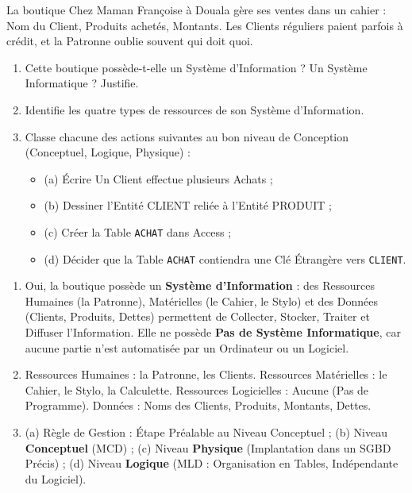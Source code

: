 \documentclass[11pt]{article}
\begin{document}
\begin{exercice}
La boutique \og Chez Maman Françoise \fg{} à Douala gère ses ventes dans un cahier : Nom du Client, Produits achetés, Montants. Les Clients réguliers paient parfois à crédit, et la Patronne oublie souvent qui doit quoi.
\begin{enumerate}
\item Cette boutique possède-t-elle un Système d'Information ? Un Système Informatique ? Justifie.
\item Identifie les quatre types de ressources de son Système d'Information.
\item Classe chacune des actions suivantes au bon niveau de Conception (Conceptuel, Logique, Physique) :
      \begin{itemize}
      \item (a) Écrire \og Un Client effectue plusieurs Achats \fg{} ;
      \item (b) Dessiner l'Entité CLIENT reliée à l'Entité PRODUIT ;
      \item (c) Créer la Table \texttt{ACHAT} dans Access ;
      \item (d) Décider que la Table \texttt{ACHAT} contiendra une Clé Étrangère vers \texttt{CLIENT}.
      \end{itemize}
\end{enumerate}
\end{exercice}

\begin{corrige}[Exercice 1]
\begin{enumerate}
\item Oui, la boutique possède un \textbf{Système d'Information} : des Ressources Humaines (la Patronne), Matérielles (le Cahier, le Stylo) et des Données (Clients, Produits, Dettes) permettent de Collecter, Stocker, Traiter et Diffuser l'Information. Elle ne possède \textbf{Pas de Système Informatique}, car aucune partie n'est automatisée par un Ordinateur ou un Logiciel.
\item Ressources Humaines : la Patronne, les Clients. Ressources Matérielles : le Cahier, le Stylo, la Calculette. Ressources Logicielles : Aucune (Pas de Programme). Données : Noms des Clients, Produits, Montants, Dettes.
\item (a) Règle de Gestion : Étape Préalable au Niveau Conceptuel ; (b) Niveau \textbf{Conceptuel} (MCD) ; (c) Niveau \textbf{Physique} (Implantation dans un SGBD Précis) ; (d) Niveau \textbf{Logique} (MLD : Organisation en Tables, Indépendante du Logiciel).
\end{enumerate}
\end{corrige}
\end{document}

